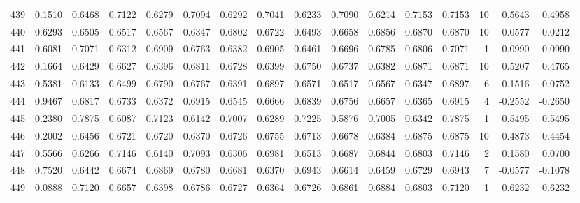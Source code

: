 \begin{tabular}{lrrrrrrrrrrrrrrr}
439 &      0.1510 &  0.6468 &  0.7122 &  0.6279 &  0.7094 &  0.6292 &  0.7041 &  0.6233 &  0.7090 &  0.6214 &   0.7153 &     0.7153 &     10 &                    0.5643 &                     0.4958 \\
440 &      0.6293 &  0.6505 &  0.6517 &  0.6567 &  0.6347 &  0.6802 &  0.6722 &  0.6493 &  0.6658 &  0.6856 &   0.6870 &     0.6870 &     10 &                    0.0577 &                     0.0212 \\
441 &      0.6081 &  0.7071 &  0.6312 &  0.6909 &  0.6763 &  0.6382 &  0.6905 &  0.6461 &  0.6696 &  0.6785 &   0.6806 &     0.7071 &      1 &                    0.0990 &                     0.0990 \\
442 &      0.1664 &  0.6429 &  0.6627 &  0.6396 &  0.6811 &  0.6728 &  0.6399 &  0.6750 &  0.6737 &  0.6382 &   0.6871 &     0.6871 &     10 &                    0.5207 &                     0.4765 \\
443 &      0.5381 &  0.6133 &  0.6499 &  0.6790 &  0.6767 &  0.6391 &  0.6897 &  0.6571 &  0.6517 &  0.6567 &   0.6347 &     0.6897 &      6 &                    0.1516 &                     0.0752 \\
444 &      0.9467 &  0.6817 &  0.6733 &  0.6372 &  0.6915 &  0.6545 &  0.6666 &  0.6839 &  0.6756 &  0.6657 &   0.6365 &     0.6915 &      4 &                   -0.2552 &                    -0.2650 \\
445 &      0.2380 &  0.7875 &  0.6087 &  0.7123 &  0.6142 &  0.7007 &  0.6289 &  0.7225 &  0.5876 &  0.7005 &   0.6342 &     0.7875 &      1 &                    0.5495 &                     0.5495 \\
446 &      0.2002 &  0.6456 &  0.6721 &  0.6720 &  0.6370 &  0.6726 &  0.6755 &  0.6713 &  0.6678 &  0.6384 &   0.6875 &     0.6875 &     10 &                    0.4873 &                     0.4454 \\
447 &      0.5566 &  0.6266 &  0.7146 &  0.6140 &  0.7093 &  0.6306 &  0.6981 &  0.6513 &  0.6687 &  0.6844 &   0.6803 &     0.7146 &      2 &                    0.1580 &                     0.0700 \\
448 &      0.7520 &  0.6442 &  0.6674 &  0.6869 &  0.6780 &  0.6681 &  0.6370 &  0.6943 &  0.6614 &  0.6459 &   0.6729 &     0.6943 &      7 &                   -0.0577 &                    -0.1078 \\
449 &      0.0888 &  0.7120 &  0.6657 &  0.6398 &  0.6786 &  0.6727 &  0.6364 &  0.6726 &  0.6861 &  0.6884 &   0.6803 &     0.7120 &      1 &                    0.6232 &                     0.6232 \\

\end{tabular}
